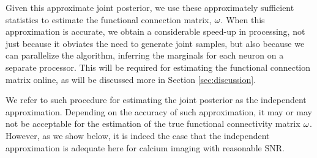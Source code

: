 \noindent 	Given this approximate joint posterior, we use these approximately sufficient statistics to estimate the functional connection matrix, $\mathbf{\omega}$.  
% 
% 
% 
% 
% 
When this approximation is accurate, we obtain a considerable speed-up in processing, not just because it obviates the need to generate joint samples, but also because we can parallelize the algorithm, inferring the marginals for each neuron on a separate processor.  This will be required for estimating the functional connection matrix online, as will be discussed more in Section \ref{sec:discussion}.


We refer to such procedure for estimating the joint posterior as the independent approximation. Depending on the accuracy of such approximation, it may or may not be acceptable for the estimation of the true functional connectivity matrix $\mathbf{\omega}$. However, as we show below, it is indeed the case that the independent approximation is adequate here for calcium imaging with reasonable SNR.

